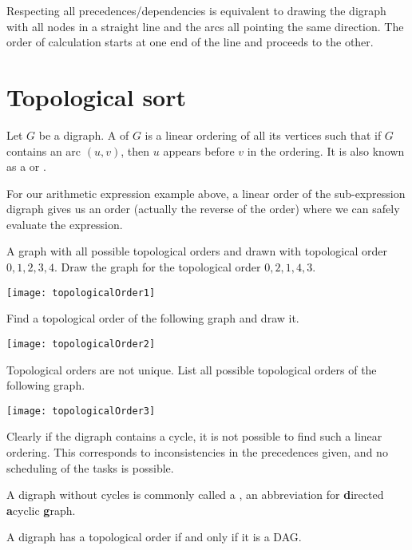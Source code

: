 Respecting all precedences/dependencies is equivalent to drawing the digraph 
with all nodes in a straight line and the arcs all pointing the same direction. 
The order of calculation starts at one end of the line and proceeds to the other.

\section{Topological sort}
\begin{Definition}
Let $G$ be a digraph. A  of $G$ is a linear
ordering of all its vertices such that if $G$ contains an arc $(u,v)$,
then $u$ appears before $v$ in the ordering. 
It is also known as a  or .
\end{Definition}

For our arithmetic expression example above, a linear
order of the sub-expression digraph gives us an order (actually the reverse
of the order) where we can safely evaluate the expression.

\begin{Boxample}[1]
A graph with all possible topological orders and drawn with topological order $0, 1, 2, 3, 4$.  
Draw the graph for the topological order $0, 2, 1, 4, 3$. 
\begin{center}
\texttt{[image: topologicalOrder1]}
\end{center}
Find a topological order of the following graph and draw it.
\begin{center}
\texttt{[image: topologicalOrder2]}
\end{center}
Topological orders are not unique. List all possible topological orders of the following graph.
\begin{center}
\texttt{[image: topologicalOrder3]}
\end{center}
\end{Boxample}

Clearly if the digraph contains a cycle, it is not possible to find
such a linear ordering. This corresponds to inconsistencies in the
precedences given, and no scheduling of the tasks is possible.

\begin{Definition}
A digraph without cycles is commonly called a , an
abbreviation for \textbf{d}irected \textbf{a}cyclic \textbf{g}raph.  
\end{Definition}

\begin{Theorem} \label{thm:topDAG}
A digraph has a topological order if and only if it is a DAG.
\end{Theorem}

